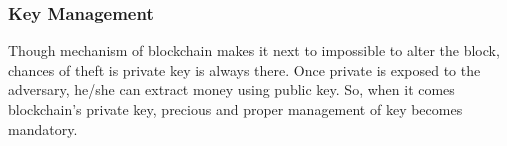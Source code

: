\documentclass[a4paper,twoside,12pt]{report}
\begin{document}
\begin{spacing}{1.5}
\subsubsection{Key Management}
Though mechanism of blockchain makes it next to impossible to alter the block, chances of theft is private key is always there. Once private is exposed to the adversary, he/she can extract money using public key. So, when it comes blockchain's private key, precious and proper management of key becomes mandatory.

\end{spacing}
\end{document}
